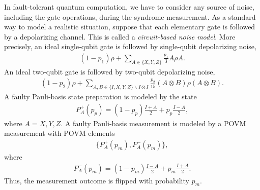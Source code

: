 In fault-tolerant quantum computation, we have to consider any source of noise, including the gate operations, during the syndrome measurement. 
As a standard way to model a realistic situation,
suppose that each elementary gate is followed by a depolarizing channel.
This is called a {\it circuit-based noise model}.
More precisely, 
an ideal single-qubit gate is followed by single-qubit depolarizing noise,
\begin{eqnarray}
(1-p_1)\rho + \sum _{A \in \{X,Y,Z\} } \frac{p_1}{3} A \rho  A.
\end{eqnarray}
An ideal two-qubit gate is followed by two-qubit depolarizing noise,
\begin{eqnarray}
(1-p_2)\rho + \sum _{A,B \in \{I, X,Y,Z\} \backslash I\otimes I} \frac{p_2}{15} (A\otimes B) \rho   (A\otimes B).
\end{eqnarray}
A faulty Pauli-basis state preparation is modeled by the state
\begin{eqnarray}
P_A^{+}(p_p) = (1-p_p) \frac{I+A}{2} + p_p \frac{I-A}{2},
\end{eqnarray}
where $A=X,Y,Z$.
A faulty Pauli-basis measurement is modeled by a POVM measurement with POVM elements
\begin{eqnarray}
\{ P_A^{+}(p_m), P_A^{-}(p_m)\},
\end{eqnarray}
where 
\begin{eqnarray}
P_A^{-}(p_m)= (1-p_m) \frac{I-A}{2} + p_m \frac{I+A}{2}.
\end{eqnarray}
Thus, the measurement outcome is flipped with probability $p_m$.

